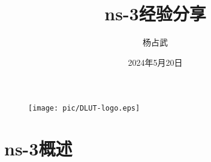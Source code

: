 \documentclass{beamer}
\author{杨占武}
\title{ns-3经验分享}
\institute{大连理工大学软件学院}
\date{2024年5月20日}
\begin{document}
\kaishu
\begin{frame}
	\titlepage
	\begin{figure}[htpb]
		\begin{center}
			\texttt{[image: pic/DLUT-logo.eps]}
		\end{center}
	\end{figure}
\end{frame}

\begin{frame}
	\tableofcontents[sectionstyle=show,subsectionstyle=show/shaded/hide,subsubsectionstyle=show/shaded/hide]
\end{frame}


\section{ns-3概述}


\end{document}
